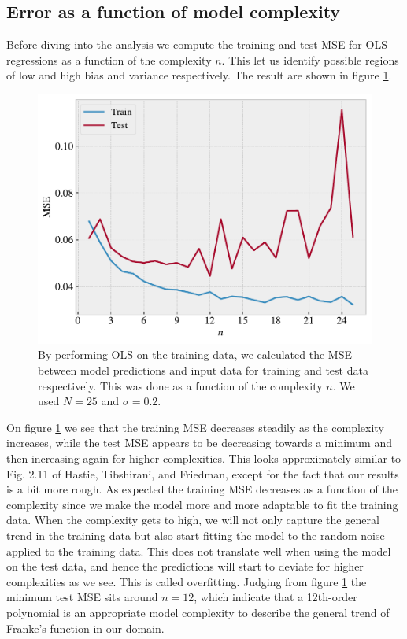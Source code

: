 \documentclass[norsk,a4paper,12pt]{scrartcl}
\begin{document}
\subsection{Error as a function of model complexity}
Before diving into the analysis we compute the training and test MSE for OLS regressions as a function of the complexity $n$. This let us identify possible regions of low and high bias and variance respectively. The result are shown in figure \ref{fig:hastie_copycat}.
\begin{figure}[H]
    \centering
    \includegraphics[width=0.7\linewidth]{figures/hastie_copycat.pdf}
    \caption{By performing OLS on the training data, we calculated the MSE between model predictions and input data for training and test data respectively. This was done as a function of the complexity $n$. We used $N = 25$ and $\sigma = 0.2$.}
    \label{fig:hastie_copycat}
\end{figure}
On figure \ref{fig:hastie_copycat} we see that the training MSE decreases steadily as the complexity increases, while the test MSE appears to be decreasing towards a minimum and then increasing again for higher complexities. This looks approximately similar to Fig. 2.11 of Hastie, Tibshirani, and Friedman, except for the fact that our results is a bit more rough. As expected the training MSE decreases as a function of the complexity since we make the model more and more adaptable to fit the training data. When the complexity gets to high, we will not only capture the general trend in the training data but also start fitting the model to the random noise applied to the training data. This does not translate well when using the model on the test data, and hence the predictions will start to deviate for higher complexities as we see. This is called overfitting. 
\pagebreak 
Judging from figure \ref{fig:hastie_copycat} the minimum test MSE sits around $n=12$, which indicate that a 12th-order polynomial is an appropriate model complexity to describe the general trend of Franke's function in our domain. \par 
\end{document}
